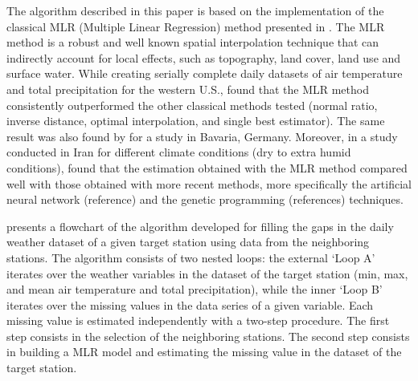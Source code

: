 \documentclass[TechnicalNoteMeteo.tex]{subfiles}
\begin{document}
The algorithm described in this paper is based on the implementation of the classical MLR (Multiple Linear Regression) method presented in \cite{eischeid_creating_2000}. The MLR method is a robust and well known spatial interpolation technique that can indirectly account for local effects, such as topography, land cover, land use and surface water. While creating serially complete daily datasets of air temperature and total precipitation for the western U.S., \cite{eischeid_creating_2000} found that the MLR method consistently outperformed the other classical methods tested (normal ratio, inverse distance, optimal interpolation, and single best estimator). The same result was also found by \cite{xia_forest_1999} for a study in Bavaria, Germany. Moreover, in a study conducted in Iran for different climate conditions (dry to extra humid conditions), \cite{kashani_evaluation_2011} found that the estimation obtained with the MLR method compared well with those obtained with more recent methods, more specifically the artificial neural network (reference) and the genetic programming (references) techniques.

 presents a flowchart of the algorithm developed for filling the gaps in the daily weather dataset of a given target station using data from the neighboring stations. The algorithm consists of two nested loops: the external `Loop A' iterates over the weather variables in the dataset of the target station (min, max, and mean air temperature and total precipitation), while the inner `Loop B' iterates over the missing values in the data series of a given variable. Each missing value is estimated independently with a two-step procedure. The first step consists in the selection of the neighboring stations. The second step consists in building a MLR model and estimating the missing value in the dataset of the target station. 
\end{document}
